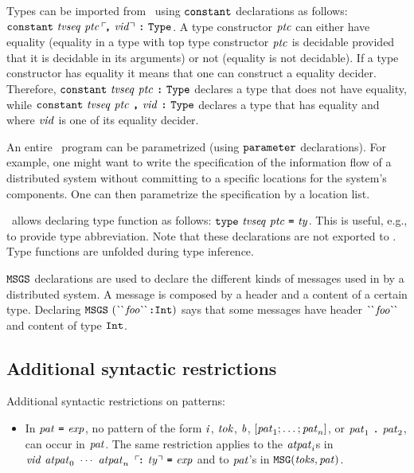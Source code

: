 \documentclass[final]{article}
\begin{document}
Types can be imported from \nuprl\ using $\mathtt{constant}$
declarations as follows:
$\mathtt{constant}\ \mathit{tvseq}\ \mathit{ptc}\,\ulcorner\!\textbf{\texttt{,}}\ \mathit{vid}\urcorner\ \textbf{\texttt{:}}\ \mathtt{Type}$.  A type
constructor $\mathit{ptc}$ can either have equality (equality in a
type with top type constructor $\mathit{ptc}$ is decidable provided that
it is decidable in its arguments) or not (equality is not decidable).
If a type constructor has equality it means that one can construct a
equality decider.  Therefore,
$\mathtt{constant}\ \mathit{tvseq}\ \mathit{ptc}\ \textbf{\texttt{:}}\ \mathtt{Type}$ declares a type that
does not have equality, while
$\mathtt{constant}\ \mathit{tvseq}\ \mathit{ptc}\ \textbf{\texttt{,}}\ \mathit{vid}\ \textbf{\texttt{:}}\ \mathtt{Type}$ declares a
type that has equality and where $\mathit{vid}$ is one of its equality
decider.

An entire \eml\ program can be parametrized (using
$\mathtt{parameter}$ declarations).  For example, one might want to
write the specification of the information flow of a distributed
system without committing to a specific locations for the system's
components.  One can then parametrize the specification by a location
list.

\eml\ allows declaring type function as follows:
$\mathtt{type}\ \mathit{tvseq}\ \mathit{ptc}\ \textbf{\texttt{=}}\ \mathit{ty}$.  This is
useful, e.g., to provide type abbreviation.  Note that these
declarations are not exported to \nuprl.  Type functions are unfolded
during type inference.

$\mathtt{MSGS}$ declarations are used to declare the different kinds of
messages used in by a distributed system.  A message is composed by a
header and a content of a certain type.  Declaring
$\CONSmsgsdec{\CONSheadert{\CONSatoms{\mbox{foo}}}{\CONSintty}}$ says
that some messages have header $\CONSatoms{\mbox{foo}}$ and content of
type $\mathtt{Int}$.



\subsection{Additional syntactic restrictions}

Additional syntactic restrictions on patterns:
\begin{itemize}
\item In $\mathit{pat}\ \textbf{\texttt{=}}\ \mathit{exp}$, no pattern of the form
  $\mathit{i}$, $\mathit{tok}$, $\mathit{b}$,
  $[\mathit{pat}_1;\dots;\mathit{pat}_n]$, or
  $\mathit{pat}_1\ \textbf{\texttt{.}}\ \mathit{pat}_2$,
  can occur in $\mathit{pat}$.
  The same restriction applies to the $\mathit{atpat}_i$s
  in
  $\mathit{vid}\ \mathit{atpat}_0\ \cdots\ \mathit{atpat}_n\ \,\ulcorner\!\textbf{\texttt{:}}\ \mathit{ty}\urcorner\ \textbf{\texttt{=}}\ \mathit{exp}$
  and to $\mathit{pat}$'s in
  $\mathtt{MSG}(\mathit{toks},\mathit{pat})$.
\end{itemize}
\end{document}
